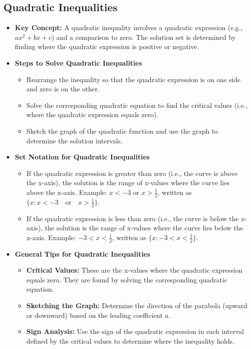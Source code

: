 
\subsection{Quadratic Inequalities}
\begin{itemize}
    \item \textbf{Key Concept:} A quadratic inequality involves a quadratic expression (e.g., $ax^2 + bx + c$) and a comparison to
    zero. The solution set is determined by finding where the quadratic expression is positive or negative.
    \item \textbf{Steps to Solve Quadratic Inequalities}
    \begin{itemize}
        \item Rearrange the inequality so that the quadratic expression is on one side and zero is on the other.
        \item Solve the corresponding quadratic equation to find the critical values (i.e., where the quadratic expression equals
        zero).
        \item Sketch the graph of the quadratic function and use the graph to determine the solution intervals.
    \end{itemize}
    \item \textbf{Set Notation for Quadratic Inequalities}
    \begin{itemize}
        \item If the quadratic expression is greater than zero (i.e., the curve is above the x-axis), the solution is the range
        of x-values where the curve lies above the x-axis. Example: $x < -3$ or $x > \frac{1}{2}$, written as
        $\{x : x < -3 \quad \text{or} \quad x > \frac{1}{2}\}$.
        \item If the quadratic expression is less than zero  (i.e., the curve is below the x-axis), the solution is the range of
        x-values where the curve lies below the x-axis. Example: $-3 < x < \frac{1}{2}$, written as
        $\{x : -3 < x < \frac{1}{2}\}$.
    \end{itemize}
    \item \textbf{General Tips for Quadratic Inequalities}
    \begin{itemize}
        \item \textbf{Critical Values:} These are the x-values where the quadratic expression equals zero. They are found by
        solving the corresponding quadratic equation.
        \item \textbf{Sketching the Graph:} Determine the direction of the parabola (upward or downward) based on the leading
        coefficient $a$.
        \item \textbf{Sign Analysis:} Use the sign of the quadratic expression in each interval defined by the critical values
        to determine where the inequality holds.
    \end{itemize}
\end{itemize}